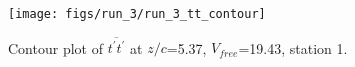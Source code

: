 \begin{figure}[H]
\centering
\texttt{[image: figs/run\_3/run\_3\_tt\_contour]}
\caption{Contour plot of $\overline{t^\prime t^\prime}$ at $z/c$=5.37, $V_{free}$=19.43, station 1.}
\label{fig:run_3_tt_contour}
\end{figure}



